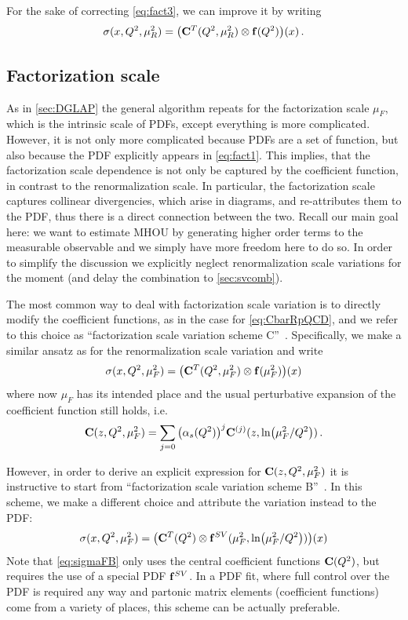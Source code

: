 For the sake of correcting \cref{eq:fact3}, we can improve it by writing
\begin{equation}
    \sigma(x,Q^2,\mu_R^2) = \qty(\vb C^T(Q^2,\mu_R^2) \otimes \vb f(Q^2))(x) \,.
\end{equation}

\subsection{Factorization scale}

As in \cref{sec:DGLAP} the general algorithm repeats for the factorization scale $\mu_F$, which is the intrinsic scale of PDFs, except everything is more complicated.
However, it is not only more complicated because PDFs are a set of function, but also because the PDF explicitly appears in \cref{eq:fact1}.
This implies, that the factorization scale dependence is not only be captured by the coefficient function, in contrast to the renormalization scale.
In particular, the factorization scale captures collinear divergencies, which arise in diagrams, and re-attributes them to the PDF, thus there is a direct connection between the two.
Recall our main goal here: we want to estimate MHOU by generating higher order terms to the measurable observable and we simply have more freedom here to do so.
In order to simplify the discussion we explicitly neglect renormalization scale variations for the moment (and delay the combination to \cref{sec:svcomb}).

The most common way to deal with factorization scale variation is to directly modify the coefficient functions, as in the case for \cref{eq:CbarRpQCD}, and we refer to this choice as \enquote{factorization scale variation scheme C}~\cite{NNPDF:2024dpb}.
Specifically, we make a similar ansatz as for the renormalization scale variation and write
\begin{equation}
    \sigma(x,Q^2,\mu_F^2) = \qty(\vb C^T(Q^2,\mu_F^2) \otimes \vb f(\mu_F^2))(x) \label{eq:sigmaFC}
\end{equation}
where now $\mu_F$ has its intended place and the usual perturbative expansion of the coefficient function still holds, i.e.\
\begin{equation}
    \vb C(z,Q^2,\mu_F^2) = \sum_{j=0} \qty(\alpha_s(Q^2))^j \vb C^{(j)}(z,\ln(\mu_F^2/Q^2)) \,. \label{eq:CbarFpQCD}
\end{equation}

However, in order to derive an explicit expression for $\vb C(z,Q^2,\mu_F^2)$ it is instructive to start from \enquote{factorization scale variation scheme B}~\cite{NNPDF:2024dpb}.
In this scheme, we make a different choice and attribute the variation instead to the PDF:
\begin{equation}
    \sigma(x,Q^2,\mu_F^2) = \qty(\vb C^T(Q^2) \otimes \vb f^{SV}(\mu_F^2,\ln(\mu_F^2/Q^2)))(x) \label{eq:sigmaFB}
\end{equation}
Note that \cref{eq:sigmaFB} only uses the central coefficient functions $\vb C(Q^2)$, but requires the use of a special PDF $\vb f^{SV}$.
In a PDF fit, where full control over the PDF is required any way and partonic matrix elements (coefficient functions) come from a variety of places, this scheme can be actually preferable.

